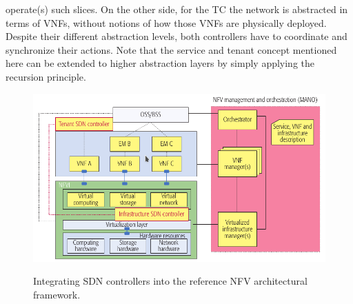 \documentclass{article}
\begin{document}
operate(s) such slices. On the other side, for the
TC the network is abstracted in terms of VNFs,
without notions of how those VNFs are physically
deployed. Despite their different abstraction levels,
both controllers have to coordinate and synchronize their actions. Note that the service and
tenant concept mentioned here can be extended
to higher abstraction layers by simply applying the
recursion principle.
\begin{figure}[h]
\centering
\includegraphics[scale=0.6]{pics/integral.png} 
\label{integral}
\caption{Integrating SDN controllers into the reference NFV architectural framework.}
\end{figure}



\newpage
\end{document}
